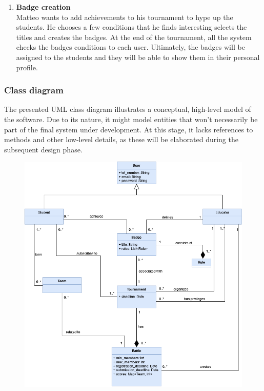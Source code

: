\begin{enumerate}[label=\textbf{\Alph*}.]
    \item \textbf{Badge creation} \\
        Matteo wants to add achievements to his tournament to hype up the students. He chooses a few conditions that he finds interesting selects the titles and creates the badges. At the end of the tournament, all the system checks the badges conditions to each user. Ultimately, the badges will be assigned to the students and they will be able to show them in their personal profile.
\end{enumerate}

\subsubsection{Class diagram}
The presented UML class diagram illustrates a conceptual, high-level model of the software. Due to its nature, it might model entities that won't necessarily be part of the final system under development. At this stage, it lacks references to methods and other low-level details, as these will be elaborated during the subsequent design phase.
\begin{figure}[H]
      \centering
      \includegraphics[scale=0.4]{src/class_uml.png}
\end{figure} \vspace{1cm}

